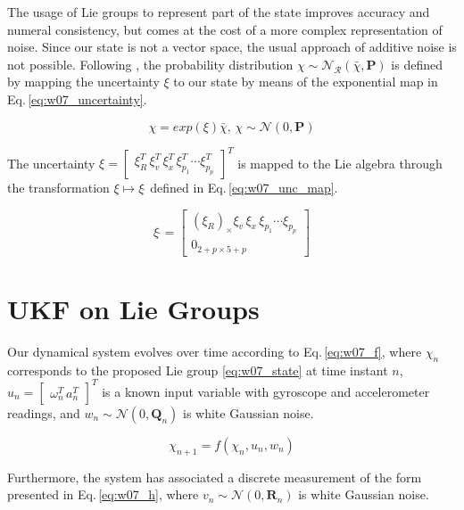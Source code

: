 \documentclass[10pt,twocolumn]{IEEEtran}
\begin{document}
The usage of Lie groups to represent part of the state improves accuracy and numeral consistency, but comes at the cost of a more complex representation of noise. Since our state is not a vector space, the usual approach of additive noise is not possible. Following \cite{barfoot2014associating}, the probability distribution $\chi \sim \mathcal{N}_\mathcal{R} \left (\bar{\chi}, \mathbf{P} \right)$ is defined by mapping the uncertainty $\xi$ to our state by means of the exponential map in Eq.\,\ref{eq:w07_uncertainty}.

\begin{equation}
    \label{eq:w07_uncertainty}
    \chi = exp(\xi)\bar{\chi},\, \chi\sim \mathcal{N}(0,\mathbf{P})
\end{equation}

The uncertainty $\xi = \begin{bmatrix}
    \xi_R^T \, \xi_v^T \, \xi_x^T \, \xi_{p_1}^T \cdots \xi_{p_p}^T
\end{bmatrix}^T$ is mapped to the Lie algebra through the transformation $\xi \mapsto \xi\,\hat{ }$ defined in Eq.\,\ref{eq:w07_unc_map}.

\begin{equation}
    \label{eq:w07_unc_map}
    \xi\,\hat{ } = 
    \begin{bmatrix}
        \left( \xi_R \right)_\times \xi_v \, \xi_x \, \xi_{p_1} \cdots \xi_{p_p}\\ 0_{2+p\times 5+p}
    \end{bmatrix}
\end{equation}

\section{UKF on Lie Groups}

Our dynamical system evolves over time according to Eq.\,\eqref{eq:w07_f}, where $\chi_n$ corresponds to the proposed Lie group \eqref{eq:w07_state} at time instant $n$, $u_n=\begin{bmatrix}
    \omega_n^T\,a_n^T
\end{bmatrix}^T$ is a known input variable with gyroscope and accelerometer readings, and $w_n\sim \mathcal{N}(0,\mathbf{Q}_n)$ is white Gaussian noise.

\begin{equation}
    \label{eq:w07_f}
    \chi_{n+1} = f\left( \chi_n, u_n, w_n \right)
\end{equation}

Furthermore, the system has associated a discrete measurement of the form presented in Eq.\,\eqref{eq:w07_h}, where $v_n\sim\mathcal{N}(0,\mathbf{R}_n)$ is white Gaussian noise.
\end{document}
